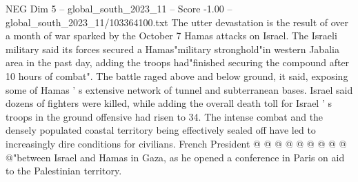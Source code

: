 \begin{textsample}{NEG Dim 5 – global\_south\_2023\_11 – Score -1.00 – global\_south\_2023\_11/103364100.txt}
The utter devastation is the result of over a month of war sparked by the October 7 Hamas attacks on Israel.
The Israeli military said its forces secured a Hamas"military stronghold"in western Jabalia area in the past day, adding the troops had"finished securing the compound after 10 hours of combat".
The battle raged above and below ground, it said, exposing some of Hamas ' s extensive network of tunnel and subterranean bases.
Israel said dozens of fighters were killed, while adding the overall death toll for Israel ' s troops in the ground offensive had risen to 34.
The intense combat and the densely populated coastal territory being effectively sealed off have led to increasingly dire conditions for civilians.
French President @ @ @ @ @ @ @ @ @ @"between Israel and Hamas in Gaza, as he opened a conference in Paris on aid to the Palestinian territory.

\end{textsample}
